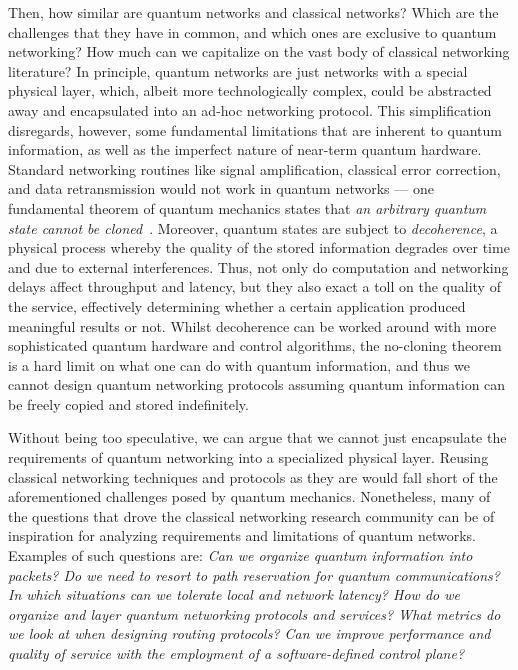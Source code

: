Then, how similar are quantum networks and classical networks? Which are the challenges that they
have in common, and which ones are exclusive to quantum networking? How much can we capitalize on
the vast body of classical networking literature? In principle, quantum networks are just networks
with a special physical layer, which, albeit more technologically complex, could be abstracted away
and encapsulated into an ad-hoc networking protocol. This simplification disregards, however, some
fundamental limitations that are inherent to quantum information, as well as the imperfect nature of
near-term quantum hardware. Standard networking routines like signal amplification, classical error
correction, and data retransmission would not work in quantum networks --- one fundamental theorem
of quantum mechanics states that \emph{an arbitrary quantum state cannot be
cloned}~\cite{wootters_1982_nocloning, dieks_1982_communication}. Moreover, quantum states are
subject to \emph{decoherence}, a physical process whereby the quality of the stored information
degrades over time and due to external interferences. Thus, not only do computation and networking
delays affect throughput and latency, but they also exact a toll on the quality of the service,
effectively determining whether a certain application produced meaningful results or not. Whilst
decoherence can be worked around with more sophisticated quantum hardware and control algorithms,
the no-cloning theorem is a hard limit on what one can do with quantum information, and thus we
cannot design quantum networking protocols assuming quantum information can be freely copied and
stored indefinitely.

Without being too speculative, we can argue that we cannot just encapsulate the requirements of
quantum networking into a specialized physical layer. Reusing classical networking techniques and
protocols as they are would fall short of the aforementioned challenges posed by quantum mechanics.
Nonetheless, many of the questions that drove the classical networking research community can be of
inspiration for analyzing requirements and limitations of quantum networks. Examples of such
questions are: \emph{Can we organize quantum information into packets? Do we need to resort to path
reservation for quantum communications? In which situations can we tolerate local and network
latency? How do we organize and layer quantum networking protocols and services? What metrics do we
look at when designing routing protocols? Can we improve performance and quality of service with the
employment of a software-defined control plane?}

